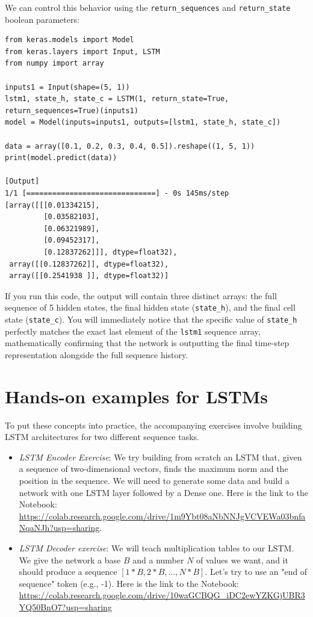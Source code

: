 We can control this behavior using the \texttt{return\_sequences} and \texttt{return\_state} boolean parameters:

\begin{verbatim}
from keras.models import Model
from keras.layers import Input, LSTM
from numpy import array

inputs1 = Input(shape=(5, 1))
lstm1, state_h, state_c = LSTM(1, return_state=True, return_sequences=True)(inputs1)
model = Model(inputs=inputs1, outputs=[lstm1, state_h, state_c])

data = array([0.1, 0.2, 0.3, 0.4, 0.5]).reshape((1, 5, 1))
print(model.predict(data))

[Output]
1/1 [==============================] - 0s 145ms/step
[array([[[0.01334215],
         [0.03582103],
         [0.06321989],
         [0.09452317],
         [0.12837262]]], dtype=float32), 
 array([[0.12837262]], dtype=float32), 
 array([[0.2541938 ]], dtype=float32)]
\end{verbatim}

If you run this code, the output will contain three distinct arrays: the full sequence of 5 hidden states, the final hidden state (\texttt{state\_h}), and the final cell state (\texttt{state\_c}). You will immediately notice that the specific value of \texttt{state\_h} perfectly matches the exact last element of the \texttt{lstm1} sequence array, mathematically confirming that the network is outputting the final time-step representation alongside the full sequence history.

\section{Hands-on examples for LSTMs}

To put these concepts into practice, the accompanying exercises involve building LSTM architectures for two different sequence tasks.

\begin{itemize}
    \item[-] \textit{LSTM Encoder Exercise}: We try building from scratch an LSTM that, given a sequence of two-dimensional vectors, finds the maximum norm and the position in the sequence. We will need to generate some data and build a network with one LSTM layer followed by a Dense one. Here is the link to the Notebook: \url{https://colab.research.google.com/drive/1m9Ybt08aNbNNJgVCVEWa03bnfaNqaNJh?usp=sharing}.
    \item[-] \textit{LSTM Decoder exercise}: We will teach multiplication tables to our LSTM. We give the network a base $B$ and a number $N$ of values we want, and it should produce a sequence $[1*B, 2*B, \dots, N*B]$. Let's try to use an "end of sequence" token (e.g., -1). Here is the link to the Notebook: \url{https://colab.research.google.com/drive/10waGCBQG_iDC2ewYZKGjUBR3YQ50BnO7?usp=sharing}
\end{itemize}

